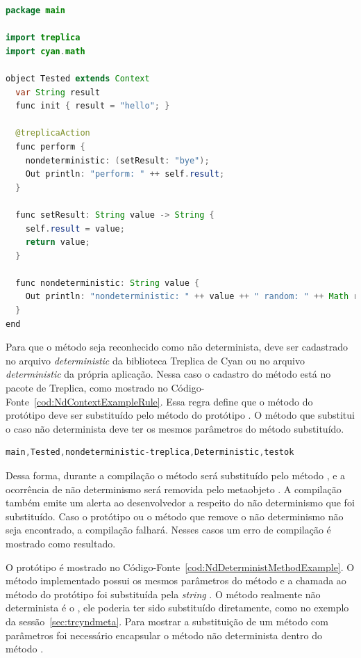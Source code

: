 \begin{lstlisting}[language=Java, caption={Contexto com ação não determinista}, label={cod:NdContextExample}]
package main

import treplica
import cyan.math

object Tested extends Context
  var String result 
  func init { result = "hello"; }

  @treplicaAction
  func perform {
    nondeterministic: (setResult: "bye");
    Out println: "perform: " ++ self.result;
  }

  func setResult: String value -> String {
    self.result = value;
    return value;
  }

  func nondeterministic: String value {
    Out println: "nondeterministic: " ++ value ++ " random: " ++ Math random;
  }
end
\end{lstlisting}

Para que o método  seja reconhecido como não determinista, deve ser cadastrado no arquivo \emph{deterministic} da biblioteca Treplica de Cyan ou no arquivo \emph{deterministic} da própria aplicação. Nessa caso o cadastro do método está no pacote de Treplica, como mostrado no Código-Fonte~\ref{cod:NdContextExampleRule}. Essa regra define que o método  do protótipo  deve ser substituído pelo método  do protótipo . O método que substitui o caso não determinista deve ter os mesmos parâmetros do método substituído.

\begin{lstlisting}[language=Java, caption={Regra de substituição cadastrada}, label={cod:NdContextExampleRule}]
main,Tested,nondeterministic-treplica,Deterministic,testok
\end{lstlisting}

Dessa forma, durante a compilação o método  será substituído pelo método , e a ocorrência de não determinismo será removida pelo metaobjeto . A compilação também emite um alerta ao desenvolvedor a respeito do não determinismo que foi substituído. Caso o protótipo ou o método que remove o não determinismo não seja encontrado, a compilação falhará. Nesses casos um erro de compilação é mostrado como resultado.

O protótipo  é mostrado no Código-Fonte~\ref{cod:NdDeterministMethodExample}. O método  implementado possui os mesmos parâmetros do método  e a chamada ao método  do protótipo  foi substituída pela \emph{string} . O método realmente não determinista é o , ele poderia ter sido substituído diretamente, como no exemplo da sessão~\ref{sec:trcyndmeta}. Para mostrar a substituição de um método com parâmetros foi necessário encapsular o método não determinista dentro do método .

